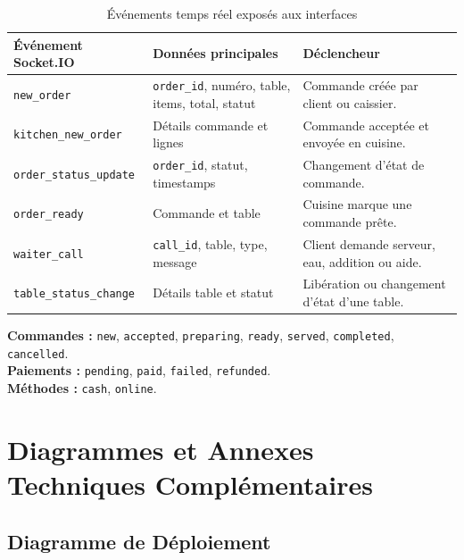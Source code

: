 \documentclass[12pt,a4paper]{report}
\begin{document}
\begin{table}[H]
    \centering
    \begin{tabularx}{\textwidth}{>{\RaggedRight\arraybackslash}p{4cm} X X}
        \toprule
        \rowcolor{secondary!10}
        \textbf{Événement Socket.IO} & \textbf{Données principales} & \textbf{Déclencheur} \\
        \midrule
        \texttt{new\_order} & \texttt{order\_id}, numéro, table, items, total, statut & Commande créée par client ou caissier. \\
        \texttt{kitchen\_new\_order} & Détails commande et lignes & Commande acceptée et envoyée en cuisine. \\
        \texttt{order\_status\_update} & \texttt{order\_id}, statut, timestamps & Changement d'état de commande. \\
        \texttt{order\_ready} & Commande et table & Cuisine marque une commande prête. \\
        \texttt{waiter\_call} & \texttt{call\_id}, table, type, message & Client demande serveur, eau, addition ou aide. \\
        \texttt{table\_status\_change} & Détails table et statut & Libération ou changement d'état d'une table. \\
        \bottomrule
    \end{tabularx}
    \caption{Événements temps réel exposés aux interfaces}
    \label{tab:socket-events}
\end{table}

\begin{designbox}
\textbf{Commandes :} \texttt{new}, \texttt{accepted}, \texttt{preparing}, \texttt{ready}, \texttt{served}, \texttt{completed}, \texttt{cancelled}.\\
\textbf{Paiements :} \texttt{pending}, \texttt{paid}, \texttt{failed}, \texttt{refunded}.\\
\textbf{Méthodes :} \texttt{cash}, \texttt{online}.
\end{designbox}

\chapter{Diagrammes et Annexes Techniques Complémentaires}

\section{Diagramme de Déploiement}
\end{document}
